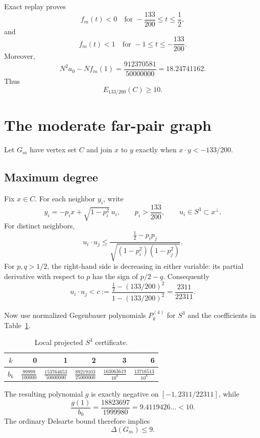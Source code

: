 \documentclass[11pt]{article}
\begin{document}
Exact replay proves
\[
f_m(t)<0\quad\text{for }-\frac{133}{200}\le t\le\frac12,
\]
and
\[
f_m(t)<1\quad\text{for }-1\le t\le-\frac{133}{200}.
\]
Moreover,
\[
N^2a_0-Nf_m(1)=\frac{912370581}{50000000}=18.24741162.
\]
Thus
\begin{equation}\label{eq:moderate}
E_{133/200}(C)\ge10.
\end{equation}

\section{The moderate far-pair graph}

Let $G_m$ have vertex set $C$ and join $x$ to $y$ exactly when
$x\cdot y<-133/200$.

\subsection{Maximum degree}

Fix $x\in C$. For each neighbor $y_i$, write
\[
y_i=-p_ix+\sqrt{1-p_i^2}\,u_i,
\qquad
p_i>\frac{133}{200},
\qquad
u_i\in S^3\subset x^\perp.
\]
For distinct neighbors,
\[
u_i\cdot u_j\le
\frac{\frac12-p_ip_j}
{\sqrt{(1-p_i^2)(1-p_j^2)}}.
\]
For $p,q>1/2$, the right-hand side is decreasing in either variable: its
partial derivative with respect to $p$ has the sign of $p/2-q$.
Consequently
\[
u_i\cdot u_j<
c:=
\frac{\frac12-(133/200)^2}{1-(133/200)^2}
=\frac{2311}{22311}.
\]

Now use normalized Gegenbauer polynomials $P_k^{(4)}$ for $S^3$ and the
coefficients in Table~\ref{tab:local}.

\begin{table}[ht]
\centering
\begin{tabular}{crrrrr}
\toprule
$k$ & 0 & 1 & 2 & 3 & 6\\
\midrule
$b_k$
& $\frac{99999}{100000}$
& $\frac{153764653}{50000000}$
& $\frac{89219103}{25000000}$
& $\frac{163063619}{10^8}$
& $\frac{13716513}{10^8}$\\
\bottomrule
\end{tabular}
\caption{Local projected $S^3$ certificate.}
\label{tab:local}
\end{table}

The resulting polynomial $g$ is exactly negative on
$[-1,2311/22311]$, while
\[
\frac{g(1)}{b_0}
=\frac{18823697}{1999980}
=9.4119426\ldots<10.
\]
The ordinary Delsarte bound therefore implies
\begin{equation}\label{eq:degree}
\Delta(G_m)\le9.
\end{equation}
\end{document}

